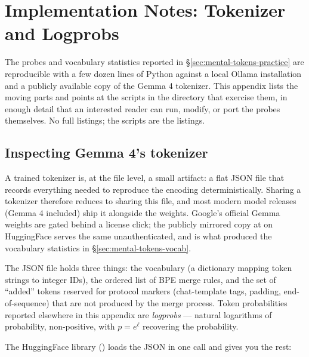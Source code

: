 
\chapter{Implementation Notes: Tokenizer and Logprobs}
\label{ch:app-impl}

The probes and vocabulary statistics reported in
\S\ref{sec:mental-tokens-practice} are reproducible with a few
dozen lines of Python against a local Ollama installation and a
publicly available copy of the Gemma 4 tokenizer. This appendix
lists the moving parts and points at the scripts in the
 directory that exercise them, in
enough detail that an interested reader can run, modify, or
port the probes themselves. No full listings; the scripts are
the listings.

\section{Inspecting Gemma 4's tokenizer}
\label{sec:app-tokenizer}

A trained tokenizer is, at the file level, a small artifact: a
flat JSON file that records everything needed to reproduce the
encoding deterministically. Sharing a tokenizer therefore
reduces to sharing this file, and most modern model releases
(Gemma 4 included) ship it alongside the weights. Google's
official Gemma weights are gated behind a license click; the
publicly mirrored copy at  on
HuggingFace serves the same 
unauthenticated, and is what produced the vocabulary statistics
in \S\ref{sec:mental-tokens-vocab}.

The JSON file holds three things: the vocabulary (a dictionary
mapping token strings to integer IDs), the ordered list of BPE
merge rules, and the set of ``added'' tokens reserved for
protocol markers (chat-template tags, padding, end-of-sequence)
that are not produced by the merge process. Token probabilities
reported elsewhere in this appendix are \emph{logprobs} ---
natural logarithms of probability, non-positive, with
$p = e^{\ell}$ recovering the probability.

The HuggingFace  library
() loads the JSON in one call and
gives you the rest:

